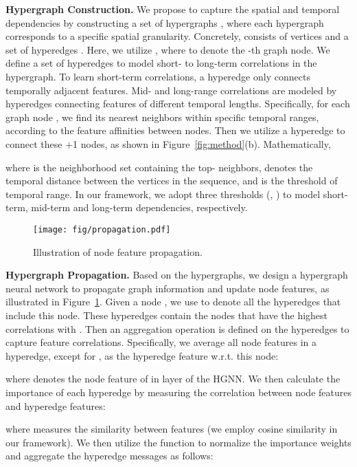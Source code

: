 \documentclass[10pt,twocolumn,letterpaper]{article}
\begin{document}
\textbf{Hypergraph Construction.}
We propose to capture the spatial and temporal dependencies by constructing a set of hypergraphs , where each hypergraph corresponds to a specific spatial granularity. Concretely,  consists of  vertices  and a set of hyperedges . Here, we utilize , where  to denote the -th graph node. We define a set of hyperedges to model short- to long-term correlations in the hypergraph. To learn short-term correlations, a hyperedge only connects temporally adjacent features. Mid- and long-range correlations are modeled by hyperedges connecting features of different temporal lengths. Specifically, for each graph node , we find its  nearest neighbors within specific temporal ranges, according to the feature affinities between nodes. Then we utilize a hyperedge to connect these +1 nodes, as shown in Figure~\ref{fig:method}(b). Mathematically,

where  is the neighborhood set containing the top- neighbors,  denotes the temporal distance between the vertices in the sequence, and  is the threshold of temporal range. In our framework, we adopt three thresholds (\ie, ) to model short-term, mid-term and long-term dependencies, respectively. 

\begin{figure}
    \centering
    \texttt{[image: fig/propagation.pdf]}
    \caption{Illustration of node feature propagation.}
    \label{fig:propagation}
    \vspace{-2mm}
\end{figure}

\textbf{Hypergraph Propagation.}
Based on the hypergraphs, we design a hypergraph neural network to propagate graph information and update node features, as illustrated in Figure~\ref{fig:propagation}. Given a node , we use  to denote all the hyperedges that include this node. These hyperedges contain the nodes that have the highest correlations with . Then an aggregation operation is defined on the hyperedges to capture feature correlations. Specifically, we average all node features in a hyperedge, except for , as the hyperedge feature w.r.t. this node:

where  denotes the node feature of  in  layer  of the HGNN.
We then calculate the importance of each hyperedge by measuring the correlation between node features and hyperedge features:

where  measures the similarity between features (we employ cosine similarity in our framework). We then utilize the  function to normalize the importance weights and aggregate the hyperedge messages as follows:
\end{document}
